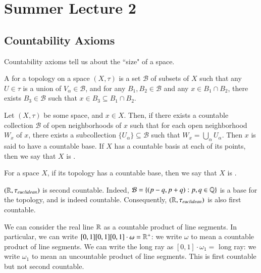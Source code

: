 \documentclass[12pt, a4paper, oneside, openright, titlepage]{book}
\begin{document}

\section{Summer Lecture 2} %

\subsection{Countability Axioms}

\begin{remark}
    Countability axioms tell us about the ``size" of a space.
\end{remark}

\begin{remark}
    A  for a topology on a space $(X,\tau)$ is a set $\mathcal{B}$ of subsets of $X$ such that any $U \in \tau$ is a union of $V_{\alpha} \in \mathcal{B}$, and for any $B_1,B_2 \in \mathcal{B}$ and any $x \in B_1\cap B_2$, there exists $B_3 \in \mathcal{B}$ such that $x \in B_3 \subseteq B_1 \cap B_2$.
\end{remark}


\begin{definition}
    Let $(X,\tau)$ be some space, and $x \in X$. Then, if there exists a countable collection $\mathcal{B}$ of open neighborhoods of $x$ such that for each open neighborhood $W_x$ of $x$, there exists a subcollection $\{U_{\alpha}\} \subseteq \mathcal{B}$ such that $W_x = \bigcup_{\alpha}U_{\alpha}$. Then $x$ is said to have a countable base. If $X$ has a countable basis at each of its points, then we say that $X$ is .
\end{definition}


\begin{definition}
    For a space $X$, if its topology has a countable base, then we say that $X$ is .
\end{definition}


\begin{example}
    $(\mathbb R,\tau_{euclidean})$ is second countable. Indeed, $\mathcal{B} = \{(p-q,p+q):p,q \in \mathbb Q\}$ is a base for the topology, and is indeed countable. Consequently, $(\mathbb R,\tau_{euclidean})$ is also first countable.
\end{example}

\begin{example}
    We can consider the real line $\mathbb R$ as a countable product of line segments. In particular, we can write $[0,1][0,1][0,1]\cdot \omega =\mathbb R^+$: we write $\omega$ to mean a countable product of line segments. We can write the long ray as $[0,1]\cdot \omega_1 = $ long ray: we write $\omega_1$ to mean an uncountable product of line segments. This is first countable but not second countable.
\end{example}
\end{document}
